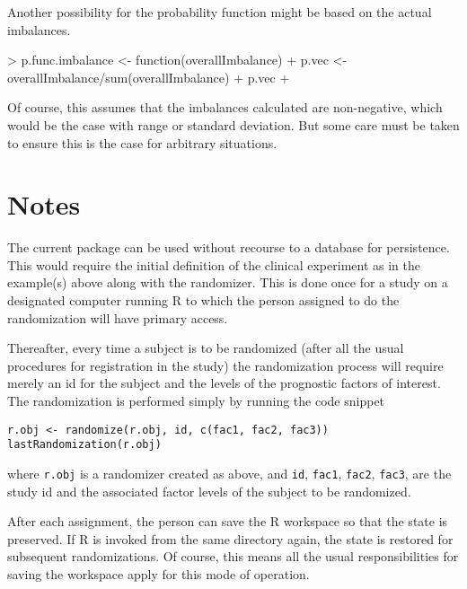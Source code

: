 \documentclass[11pt, letter]{article}
\numberwithin{equation}{section}
\begin{document}
Another possibility for the probability function might be based on the
actual imbalances.

\begin{Schunk}
\begin{Sinput}
> p.func.imbalance <- function(overallImbalance) {
+     p.vec <- overallImbalance/sum(overallImbalance)
+     p.vec
+ }
\end{Sinput}
\end{Schunk}

Of course, this assumes that the imbalances calculated are
non-negative, which would be the case with range or standard
deviation. But some care must be taken to ensure this is the case for
arbitrary situations.

\section{Notes}
\label{sec:notes}

The current package can be used without recourse to a database for
persistence.  This would require the initial definition of the
clinical experiment as in the example(s) above along with the
randomizer. This is done once for a study on a designated computer
running R to which the person assigned to do the randomization will
have primary access. 

Thereafter, every time a subject is to be randomized (after all the
usual procedures for registration in the study) the randomization
process will require merely an id for the subject and the levels of
the prognostic factors of interest. The randomization is performed
simply by running the code snippet

\begin{verbatim}
r.obj <- randomize(r.obj, id, c(fac1, fac2, fac3))
lastRandomization(r.obj)
\end{verbatim}

where \texttt{r.obj} is a randomizer created as above, and
\texttt{id}, \texttt{fac1}, \texttt{fac2}, \texttt{fac3}, are the
study id and the associated factor levels of the subject to be
randomized. 

After each assignment, the person can save the R workspace so that the
state is preserved.  If R is invoked from the same directory again,
the state is restored for subsequent randomizations. Of course, this
means all the usual responsibilities for saving the workspace apply
for this mode of operation. 




\end{document}
